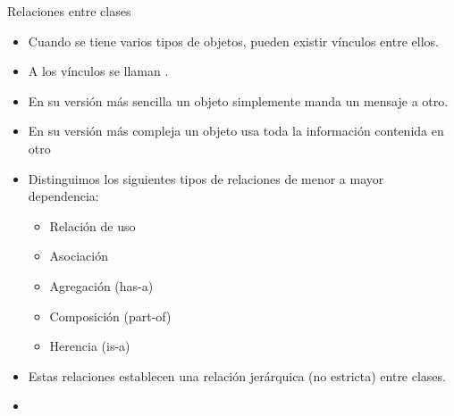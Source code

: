 \documentclass[10pt,envcountsect,spanish]{beamer}
\begin{document}
\begin{frame}{Relaciones entre clases}  

\begin{itemize} 
\item Cuando se tiene varios tipos de objetos,  pueden existir vínculos entre ellos. 

\item A los vínculos se llaman .

\item En su versión más sencilla  un objeto simplemente manda un mensaje a otro.

\item En su versión más compleja un objeto usa toda la información contenida en otro

\item Distinguimos los siguientes tipos de relaciones de menor a mayor dependencia:

\begin{itemize} 
\item Relación de uso
\item Asociación
\item Agregación (has-a)
\item Composición (part-of)
\item Herencia (is-a)
\end{itemize}


\item Estas relaciones establecen una relación jerárquica (no estricta) entre clases.

\item {}

\end{itemize}


\end{frame}
\end{document}
